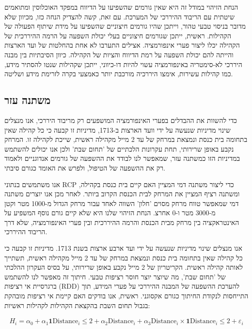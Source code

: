הנחת הזיהוי במודל זה היא שאין גורמים שהשפיעו על הדיווח במפקד האוכלוסין ומתואמים שיטתית עם הריבוד ההיררכי של המערכת. עם זאת, קשה להצדיק הנחה כזו, מכיוון שלא מדובר בניסוי טבעי טהור, וייתכן שהיו גורמים חיצוניים שהשפיעו על מידת שיתוף הפעולה של הקהילות. ראשית, ייתכן שגורמים חיצוניים בעלי יכולת השפעה על הרמה ההיררכית של הקהילה יכלו ליצור פערי אינפורמציה. אצילים התערבו לא אחת בהחלטות של ועד הארצות והייתה להם יכולת השפעה על רמת הדיווח והציות של הקהילה. כיוון הסיבתיות בין מבנה היררכי לא-סימטריה באינפורמציה עשוי להיות דו-כיווני, ייתכן שקהילות שנטו להסתיר מידע, כמו קהילות עשירות, אימצו היררכיה מורכבת יותר כאמצעי בקרה לזרימת מידע ושליטה.


\subsection{משתנה עזר}

כדי להשוות את ההבדלים בפערי האינפורמציה המושפעים רק מריבוד היררכי, אנו מנצלים שינוי מדיניות שנעשה על ידי וועד הארצות ב-1713, מדיניות זו קבעה כי כל קהילה שאין בתחומה בית כנסת ונמצאת במרחק של עד 2 מייל מקהילה ראשית, שייכת לקהילה זו. המרחק נקבע באופן שרירותי, תחת עקרונות הלכתיים של 'תחום שבת' ולכן אנו יכולים להשתמש במדיניות הזו כמשתנה עזר, שמאפשר לנו לבודד את ההשפעה של גורמים אנדוגניים ולאמוד רק את ההשפעה של הטיפול, ולפרש את האומד כגורם סיבתי.  

אנו משתמשים בנתוני RCP כדי ליצור משתנה דמי המציין האם קיים בית כנסת בקהילה, ומשתנה רציף המציין את המרחק לבית הכנסת הקרוב ביותר. לאחר מכן אנו יוצרים משתנה דמי שמאפשר טווח מרחק מסוים 'חלון' השווה לאחד עבור מרחק הגדול מ-1000 מטר וקטן מ-3000 מטר ו-0 אחרצ. הנחת הזיהוי שלנו היא שלא קיים גורם נוסף המשפיע על האינטראקציה בין מרחק מבית הכנסת והרמה ההיררכית ובין פערי האינפורמציה, שלא דרך הריבוד ההיררכי.


אנו מנצלים שינוי מדיניות שנעשה על ידי ועד ארבע ארצות בשנת 1713. מדיניות זו קבעה כי כל קהילה שאין בתחומה בית כנסת ונמצאת במרחק של עד 2 מייל מקהילה ראשית, תשתייך לאותה קהילה ראשית. הקריטריון של 2 מייל נקבע באופן שרירותי, על בסיס העקרון ההלכתי של 'תחום שבת', מה שיוצר יוצר חוסר רציפות טבעי. חיתוך זה מאפשר לנו להשתמש ברגרסיית אי רציפות (RDD) להערכת ההשפעה של המבנה ההיררכי על פערי המידע, תוך התייחסות לנקודת החיתוך כגורם אקסוגני. ראשית, אנו בודקים האם קיימת אי רציפות מובהקת בגבול תחום השבת בהקצאת הקהילות לקהילות ראשיות:


\begin{align}
H_{i} = \alpha_0 + \alpha_1 \mathbf{1}{\text{Distance}_i \leq 2} + \alpha_2 \text{Distance}_i + \alpha_3 \text{Distance}_i \times \mathbf{1}{\text{Distance}_i \leq 2} + \varepsilon_i
\end{align}

